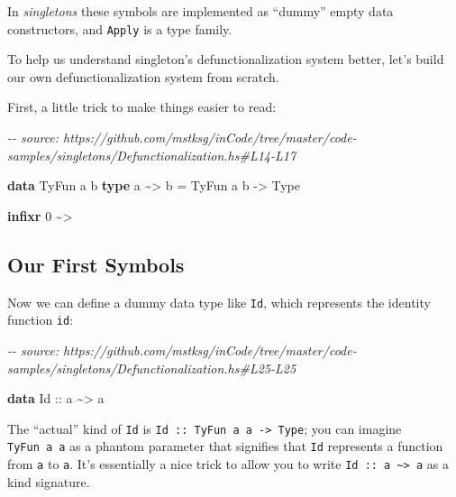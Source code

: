 \documentclass[]{article}
\newenvironment{Shaded}{}{}
\newcommand{\CommentTok}[1]{\textcolor[rgb]{0.38,0.63,0.69}{\textit{#1}}}
\newcommand{\DataTypeTok}[1]{\textcolor[rgb]{0.56,0.13,0.00}{#1}}
\newcommand{\DecValTok}[1]{\textcolor[rgb]{0.25,0.63,0.44}{#1}}
\newcommand{\KeywordTok}[1]{\textcolor[rgb]{0.00,0.44,0.13}{\textbf{#1}}}
\newcommand{\NormalTok}[1]{#1}
\newcommand{\OperatorTok}[1]{\textcolor[rgb]{0.40,0.40,0.40}{#1}}
\newcommand{\OtherTok}[1]{\textcolor[rgb]{0.00,0.44,0.13}{#1}}
\begin{document}
In \emph{singletons} these symbols are implemented as ``dummy'' empty data
constructors, and \texttt{Apply} is a type family.

To help us understand singleton's defunctionalization system better, let's build
our own defunctionalization system from scratch.

First, a little trick to make things easier to read:

\begin{Shaded}
\begin{Highlighting}[]
\CommentTok{{-}{-} source: https://github.com/mstksg/inCode/tree/master/code{-}samples/singletons/Defunctionalization.hs\#L14{-}L17}

\KeywordTok{data} \DataTypeTok{TyFun}\NormalTok{ a b}
\KeywordTok{type}\NormalTok{ a }\OperatorTok{\textasciitilde{}\textgreater{}}\NormalTok{ b }\OtherTok{=} \DataTypeTok{TyFun}\NormalTok{ a b }\OtherTok{{-}\textgreater{}} \DataTypeTok{Type}

\KeywordTok{infixr} \DecValTok{0} \OperatorTok{\textasciitilde{}\textgreater{}}
\end{Highlighting}
\end{Shaded}

\subsection{Our First Symbols}\label{our-first-symbols}

Now we can define a dummy data type like \texttt{Id}, which represents the
identity function \texttt{id}:

\begin{Shaded}
\begin{Highlighting}[]
\CommentTok{{-}{-} source: https://github.com/mstksg/inCode/tree/master/code{-}samples/singletons/Defunctionalization.hs\#L25{-}L25}

\KeywordTok{data} \DataTypeTok{Id}\OtherTok{ ::}\NormalTok{ a }\OperatorTok{\textasciitilde{}\textgreater{}}\NormalTok{ a}
\end{Highlighting}
\end{Shaded}

The ``actual'' kind of \texttt{Id} is
\texttt{Id\ ::\ TyFun\ a\ a\ -\textgreater{}\ Type}; you can imagine
\texttt{TyFun\ a\ a} as a phantom parameter that signifies that \texttt{Id}
represents a function from \texttt{a} to \texttt{a}. It's essentially a nice
trick to allow you to write
\texttt{Id\ ::\ a\ \textasciitilde{}\textgreater{}\ a} as a kind signature.
\end{document}
